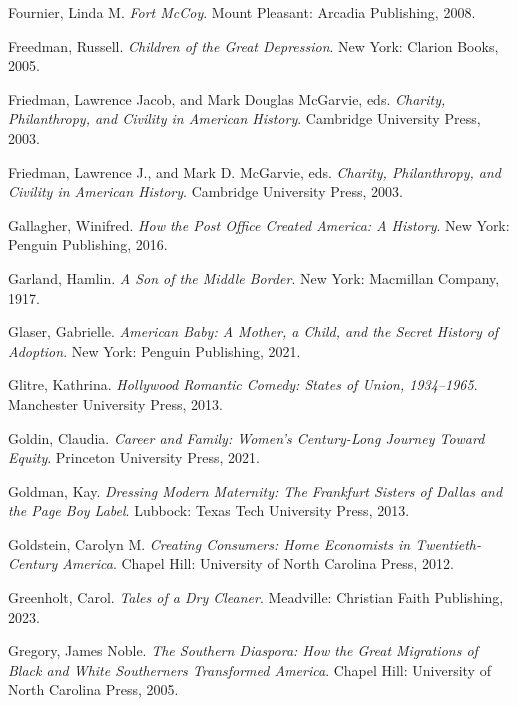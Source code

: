 \documentclass[
  american,
  letterpaper,
]{book}
\newlength{\cslhangindent}
\newenvironment{CSLReferences}[2] %
 {\begin{list}{}{%
  \setlength{\itemindent}{0pt}
  \setlength{\leftmargin}{0pt}
  \setlength{\parsep}{0pt}
  \ifodd #1
   \setlength{\leftmargin}{\cslhangindent}
   \setlength{\itemindent}{-1\cslhangindent}
  \fi
  \setlength{\itemsep}{#2\baselineskip}}}
 {\end{list}}
\begin{document}
\begin{CSLReferences}{1}{0}
Fournier, Linda M. \emph{Fort McCoy}. Mount Pleasant: Arcadia
Publishing, 2008.

Freedman, Russell. \emph{Children of the Great Depression}. New York:
Clarion Books, 2005.

Friedman, Lawrence Jacob, and Mark Douglas McGarvie, eds. \emph{Charity,
Philanthropy, and Civility in American History}. Cambridge University
Press, 2003.

Friedman, Lawrence J., and Mark D. McGarvie, eds. \emph{Charity,
Philanthropy, and Civility in American History}. Cambridge University
Press, 2003.

Gallagher, Winifred. \emph{How the Post Office Created America: A
History}. New York: Penguin Publishing, 2016.

Garland, Hamlin. \emph{A Son of the Middle Border}. New York: Macmillan
Company, 1917.

Glaser, Gabrielle. \emph{American Baby: A Mother, a Child, and the
Secret History of Adoption}. New York: Penguin Publishing, 2021.

Glitre, Kathrina. \emph{Hollywood Romantic Comedy: States of Union,
1934--1965}. Manchester University Press, 2013.

Goldin, Claudia. \emph{Career and Family: Women's Century-Long Journey
Toward Equity}. Princeton University Press, 2021.

Goldman, Kay. \emph{Dressing Modern Maternity: The Frankfurt Sisters of
Dallas and the Page Boy Label}. Lubbock: Texas Tech University Press,
2013.

Goldstein, Carolyn M. \emph{Creating Consumers: Home Economists in
Twentieth-Century America}. Chapel Hill: University of North Carolina
Press, 2012.

Greenholt, Carol. \emph{Tales of a Dry Cleaner}. Meadville: Christian
Faith Publishing, 2023.

Gregory, James Noble. \emph{The Southern Diaspora: How the Great
Migrations of Black and White Southerners Transformed America}. Chapel
Hill: University of North Carolina Press, 2005.


\end{CSLReferences}
\end{document}
